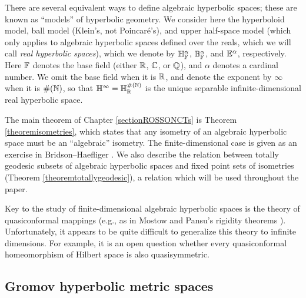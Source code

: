 There are several equivalent ways to define algebraic hyperbolic spaces; these are known as ``models'' of hyperbolic geometry. We consider here the hyperboloid model, ball model (Klein's, not Poincar\'e's), and upper half-space model (which only applies to algebraic hyperbolic spaces defined over the reals, which we will call \emph{real hyperbolic spaces}), which we denote by $\H_\F^\alpha$, $\B_\F^\alpha$, and $\E^\alpha$, respectively. Here $\F$ denotes the base field (either $\R$, $\C$, or $\Q$), and $\alpha$ denotes a cardinal number. We omit the base field when it is $\R$, and denote the exponent by $\infty$ when it is $\#(\N)$, so that $\H^\infty = \H_\R^{\#(\N)}$ is the unique separable infinite-dimensional real hyperbolic space.%

The main theorem of Chapter \ref{sectionROSSONCTs} is Theorem \ref{theoremisometries}, which states that any isometry of an algebraic hyperbolic space must be an ``algebraic'' isometry. The finite-dimensional case is given as an exercise in Bridson--Haefliger \cite[Exercise II.10.21]{BridsonHaefliger}. We also describe the relation between totally geodesic subsets of algebraic hyperbolic spaces and fixed point sets of isometries (Theorem \ref{theoremtotallygeodesic}), a relation which will be used throughout the paper.

\begin{remark}
Key to the study of finite-dimensional algebraic hyperbolic spaces is the theory of quasiconformal mappings (e.g., as in Mostow and Pansu's rigidity theorems \cite{Mostow, Pansu1}). Unfortunately, it appears to be quite difficult to generalize this theory to infinite dimensions. For example, it is an open question \cite[p.1335]{Heinonen2} whether every quasiconformal homeomorphism of Hilbert space is also quasisymmetric.
\end{remark}

\subsection{Gromov hyperbolic metric spaces}
\label{subsubsectionlist}

